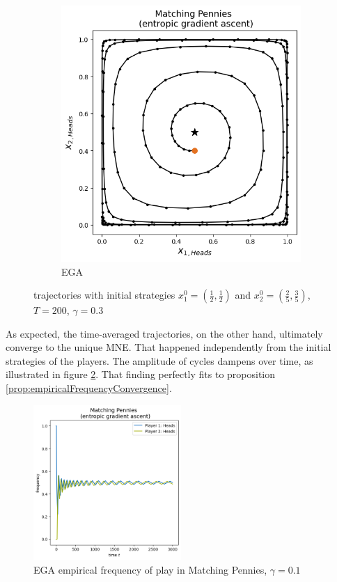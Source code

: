 \begin{figure}[H]
\begin{subfigure}{.5\textwidth}
    \includegraphics[width=\textwidth]{logos/Pennies6.png}
    \caption{EGA}
\end{subfigure}
\caption{trajectories with initial strategies $x_{1}^0 = (\frac{1}{2},\frac{1}{2})$ and $x_{2}^0 = (\frac{2}{5},\frac{3}{5})$, $T = 200$, $\gamma = 0.3$}
\label{fig:PenniesDivergence}
\end{figure} 


As expected, the time-averaged trajectories, on the other hand, ultimately converge to the unique MNE. That happened independently from the initial strategies of the players. The amplitude of cycles dampens over time, as illustrated in figure \ref{fig:Pennies7}. That finding perfectly fits to proposition \ref{prop:empiricalFrequencyConvergence}.

\begin{figure}[H]
    \centering
    \includegraphics[width=0.5\textwidth]{logos/Pennies7.png}
    \caption{EGA empirical frequency of play in Matching Pennies, $\gamma = 0.1$}
    \label{fig:Pennies7}
\end{figure}


